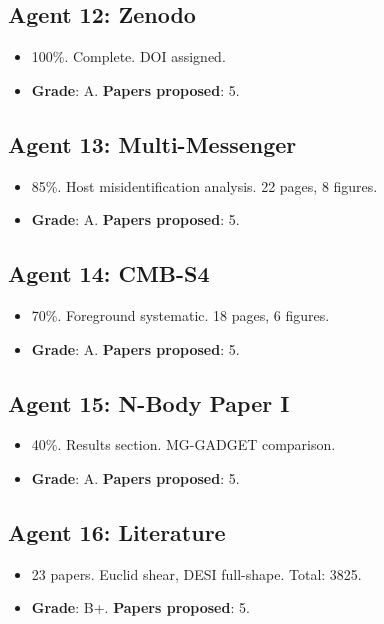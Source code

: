 \documentclass[11pt,a4paper]{article}
\begin{document}
\subsection{Agent 12: Zenodo}
\begin{itemize}[nosep]
\item 100\%. Complete. DOI assigned.
\item \textbf{Grade}: A. \textbf{Papers proposed}: 5.
\end{itemize}

\subsection{Agent 13: Multi-Messenger}
\begin{itemize}[nosep]
\item 85\%. Host misidentification analysis. 22 pages, 8 figures.
\item \textbf{Grade}: A. \textbf{Papers proposed}: 5.
\end{itemize}

\subsection{Agent 14: CMB-S4}
\begin{itemize}[nosep]
\item 70\%. Foreground systematic. 18 pages, 6 figures.
\item \textbf{Grade}: A. \textbf{Papers proposed}: 5.
\end{itemize}

\subsection{Agent 15: N-Body Paper I}
\begin{itemize}[nosep]
\item 40\%. Results section. MG-GADGET comparison.
\item \textbf{Grade}: A. \textbf{Papers proposed}: 5.
\end{itemize}

\subsection{Agent 16: Literature}
\begin{itemize}[nosep]
\item 23 papers. Euclid shear, DESI full-shape. Total: 3825.
\item \textbf{Grade}: B+. \textbf{Papers proposed}: 5.
\end{itemize}
\end{document}
